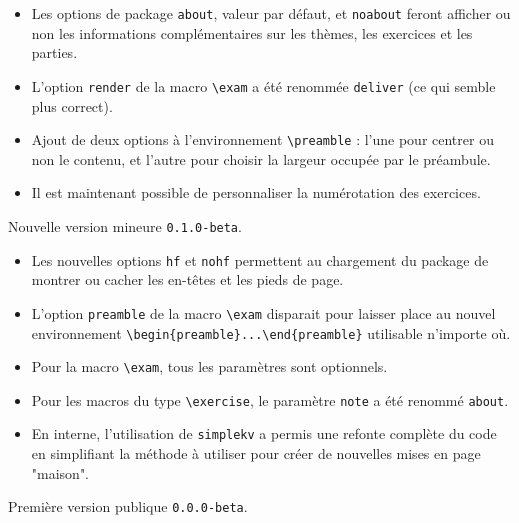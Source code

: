 \documentclass[12pt,a4paper]{scrartcl}
\theoremstyle{definition}
\begin{document}
\begin{description}[leftmargin=1em]
\begin{itemize}
        \item Les options de package \verb+about+, valeur par défaut, et \verb+noabout+ feront afficher ou non les informations complémentaires sur les thèmes, les exercices et les parties.

        \item L'option \verb+render+ de la macro \verb+\exam+ a été renommée \verb+deliver+ (ce qui semble plus correct).

        \item Ajout de deux options à l'environnement \verb+\preamble+ : l'une pour centrer ou non le contenu, et l'autre pour choisir la largeur occupée par le préambule.

        \item Il est maintenant possible de personnaliser la numérotation des exercices.
    \end{itemize}


    \item[2017-11-12] Nouvelle version mineure \verb+0.1.0-beta+.
    \begin{itemize}
        \item Les nouvelles options \verb+hf+ et \verb+nohf+ permettent au chargement du package de montrer ou cacher les en-têtes et les pieds de page.

        \item L'option \verb+preamble+ de la macro \verb+\exam+ disparait pour laisser place au nouvel environnement \verb+\begin{preamble}...\end{preamble}+ utilisable n'importe où.

        \item Pour la macro \verb+\exam+, tous les paramètres sont optionnels.

        \item Pour les macros du type \verb+\exercise+, le paramètre \verb+note+ a été renommé \verb+about+.

        \item En interne, l'utilisation de \verb+simplekv+ a permis une refonte complète du code en simplifiant la méthode à utiliser pour créer de nouvelles mises en page "maison".
    \end{itemize}


    \item[2017-11-03] Première version publique \verb+0.0.0-beta+.
\end{description}
\end{document}
